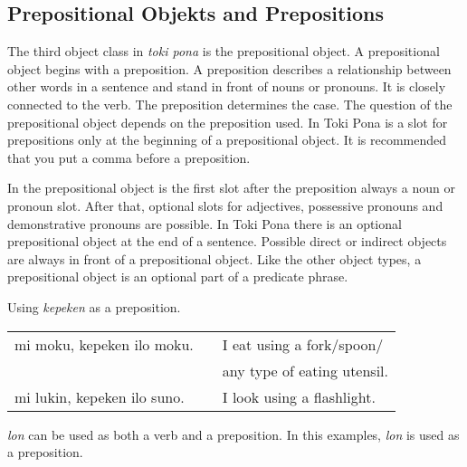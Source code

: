 \subsection*{Prepositional Objekts and Prepositions}
%
The third object class in \textit{toki pona} is the prepositional object. 
A prepositional object begins with a preposition. 
A preposition describes a relationship between other words in a sentence and stand in front of nouns or pronouns. 
It is closely connected to the verb. 
The preposition determines the case. 
The question of the prepositional object depends on the preposition used. 
In Toki Pona is a slot for prepositions only at the beginning of a prepositional object. 
It is recommended that you put a comma before a preposition.

In the prepositional object is the first slot after the preposition always a noun or pronoun slot.
After that, optional slots for adjectives, possessive pronouns and demonstrative pronouns are possible. 
In Toki Pona there is an optional prepositional object at the end of a sentence. 
Possible direct or indirect objects are always in front of a prepositional object. 
Like the other object types, a prepositional object is an optional part of a predicate phrase. 


Using \textit{kepeken} as a preposition.

\begin{supertabular}{p{5,5cm}|ll}
mi moku, kepeken ilo moku. && I eat using a fork/spoon/ \\ && any type of eating utensil. \\
mi lukin, kepeken ilo suno. && I look using a flashlight.  \\
\end{supertabular} 

%
%
\textit{lon} can be used as both a verb and a preposition. 
In this examples, \textit{lon} is used as a preposition.

